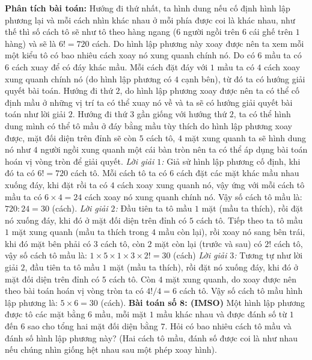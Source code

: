 \begin{multicols}{2}
\vskip 0.1cm
\textbf{\color{toancuabi}Phân tích bài toán:} Hướng đi thứ nhất, ta hình dung nếu cố định hình lập phương lại và mỗi cách nhìn khác nhau ở mỗi phía được coi là khác nhau, như thế thì số cách tô sẽ như tô theo hàng ngang ($6$ người ngồi trên $6$ cái ghế trên $1$ hàng) và sẽ là $6!=720$ cách. Do hình lập phương này xoay được nên ta xem mỗi một kiểu tô có bao nhiêu cách xoay nó xung quanh chính nó. Do có $6$ mầu ta có $6$ cách xuay để có đáy khác mầu. Mỗi cách đặt đáy với $1$ mầu ta có $4$ cách xoay xung quanh chính nó (do hình lập phương có $4$ cạnh bên), từ đó ta có hướng giải quyết bài toán.
\vskip 0.1cm
Hướng đi thứ $2$, do hình lập phương xoay được nên ta có thể cố định mầu ở những vị trí ta có thể xuay nó về và ta sẽ có hướng giải quyết bài toán như lời giải $2$.
\vskip 0.1cm
Hướng đi thứ $3$ gần giống với hướng thứ $2$, ta có thể hình dung mình có thể tô mầu ở đáy bằng mầu tùy thích do hình lập phương xoay được, mặt đối diện trên đỉnh sẽ còn $5$ cách tô, $4$ mặt xung quanh ta sẽ hình dung nó như $4$ người ngồi xung quanh một cái bàn tròn nên ta có thể áp dụng bài toán hoán vị vòng tròn để giải quyết.
\vskip 0.1cm
\textit{Lời giải $1$:}
Giả sử hình lập phương cố định, khi đó ta có $6!=720$ cách tô.
\vskip 0.1cm
Mỗi cách tô ta có $6$ cách đặt các mặt khác mầu nhau xuống đáy, khi đặt rồi ta có $4$ cách xoay xung quanh nó, vậy ứng với mỗi cách tô mầu ta có $6\times4=24$ cách xoay nó xung quanh chính nó. Vậy số cách tô mầu là: $720:24=30$ (cách).
\vskip 0.1cm
\textit{Lời giải $2$:}
Đầu tiên ta tô mầu $1$ mặt (mầu ta thích), rồi đặt nó xuống đáy, khi đó ở mặt đối diện trên đỉnh có $5$ cách tô.
\vskip 0.1cm
Tiếp theo ta tô mầu $1$ mặt xung quanh (mầu ta thích trong $4$ mầu còn lại), rồi xoay nó sang bên trái, khi đó mặt bên phải có $3$ cách tô, còn $2$ mặt còn lại (trước và sau) có $2!$ cách tô, vậy số cách tô mầu là: $1\times5\times1\times3\times2!=30$ (cách)
\vskip 0.1cm
\textit{Lời giải $3$:}
Tương tự như lời giải $2$, đầu tiên ta tô mầu $1$ mặt (mầu ta thích), rồi đặt nó xuống đáy, khi đó ở mặt đối diện trên đỉnh có $5$ cách tô.
\vskip 0.1cm
Còn $4$ mặt xung quanh, do xoay được nên theo bài toán hoán vị vòng tròn ta có $4!/4=6$ cách tô.
\vskip 0.1cm
Vậy số cách tô mầu hình lập phương là: $5\times 6=30$ (cách).
\vskip 0.1cm
\textbf{\color{toancuabi}Bài toán số $\pmb{8}$: (IMSO)}
\vskip 0.1cm
Một hình lập phương được tô các mặt bằng $6$ mầu, mỗi mặt $1$ mầu khác nhau và được đánh số từ $1$ đến $6$ sao cho tổng hai mặt đối diện bằng $7$. Hỏi có bao nhiêu cách tô mầu và đánh số hình lập phương này? (Hai cách tô mầu, đánh số được coi là như nhau nếu chúng nhìn giống hệt nhau sau một phép xoay hình). 

\end{multicols}
